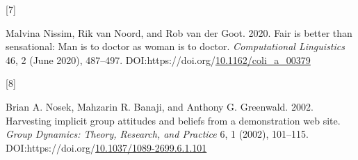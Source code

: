 \documentclass[
  10pt,
  dvipsnames,enabledeprecatedfontcommands]{scrartcl}
\newlength{\cslhangindent}
\newlength{\csllabelwidth}
\newlength{\cslentryspacingunit} %
\newenvironment{CSLReferences}[2] %
 {%
  \setlength{\parindent}{0pt}
  \ifodd #1
  \let\oldpar\par
  \def\par{\hangindent=\cslhangindent\oldpar}
  \fi
  \setlength{\parskip}{#2\cslentryspacingunit}
 }%
 {}
\newcommand{\CSLLeftMargin}[1]{\parbox[t]{\csllabelwidth}{#1}}
\newcommand{\CSLRightInline}[1]{\parbox[t]{\linewidth - \csllabelwidth}{#1}\break}
\begin{document}
\begin{CSLReferences}{0}{0}
\leavevmode{}%
\CSLLeftMargin{{[}7{]} }
\CSLRightInline{Malvina Nissim, Rik van Noord, and Rob van der Goot.
2020. Fair is better than sensational: Man is to doctor as woman is to
doctor. \emph{Computational Linguistics} 46, 2 (June 2020), 487--497.
DOI:https://doi.org/\href{https://doi.org/10.1162/coli_a_00379}{10.1162/coli\_a\_00379}}

\leavevmode{}%
\CSLLeftMargin{{[}8{]} }
\CSLRightInline{Brian A. Nosek, Mahzarin R. Banaji, and Anthony G.
Greenwald. 2002. Harvesting implicit group attitudes and beliefs from a
demonstration web site. \emph{Group Dynamics: Theory, Research, and
Practice} 6, 1 (2002), 101--115.
DOI:https://doi.org/\href{https://doi.org/10.1037/1089-2699.6.1.101}{10.1037/1089-2699.6.1.101}}

\end{CSLReferences}
\end{document}
